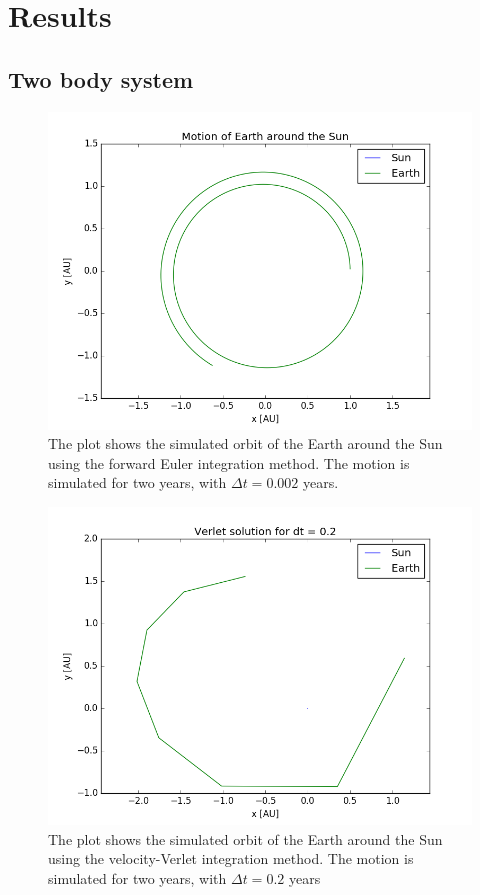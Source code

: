 \section{Results}
\subsection{Two body system}
\begin{figure}[h]
\includegraphics[scale=0.7]{figures/earth_sun_euler}
\caption{The plot shows the simulated orbit of the Earth around the Sun using the forward Euler integration method. The motion is simulated for two years, with $\Delta t = 0.002$ years.}
\end{figure}


\begin{figure}[h]
\includegraphics[scale=0.7]{figures/verlet_02}
\caption{The plot shows the simulated orbit of the Earth around the Sun using the velocity-Verlet integration method. The motion is simulated for two years, with $\Delta t = 0.2$ years}
\end{figure}

